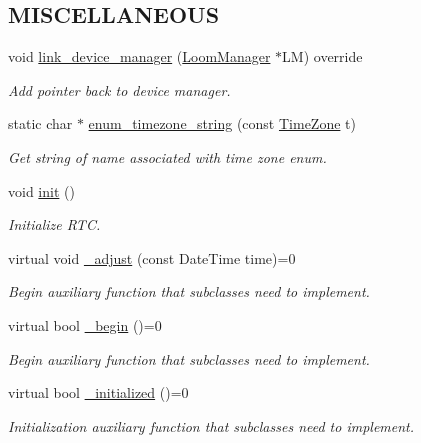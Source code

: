 \subsection*{M\+I\+S\+C\+E\+L\+L\+A\+N\+E\+O\+US}
\begin{DoxyCompactItemize}
\item 
void \hyperlink{class_loom_r_t_c_a24c72617d7e275e89740af4f5296e42b}{link\+\_\+device\+\_\+manager} (\hyperlink{class_loom_manager}{Loom\+Manager} $\ast$LM) override
\begin{DoxyCompactList}\small\item\em Add pointer back to device manager. \end{DoxyCompactList}\item 
static char $\ast$ \hyperlink{class_loom_r_t_c_ae388e3498ce6b942ccff838c2a4359fb}{enum\+\_\+timezone\+\_\+string} (const \hyperlink{class_loom_r_t_c_a103a9db94b031555185bbce688d2527a}{Time\+Zone} t)
\begin{DoxyCompactList}\small\item\em Get string of name associated with time zone enum. \end{DoxyCompactList}\item 
void \hyperlink{class_loom_r_t_c_a008e89e23f3650d1e8a9c96fe1d8c857}{init} ()
\begin{DoxyCompactList}\small\item\em Initialize R\+TC. \end{DoxyCompactList}\item 
virtual void \hyperlink{class_loom_r_t_c_a748cbec6163eee36ec96346526b8094d}{\+\_\+adjust} (const Date\+Time time)=0
\begin{DoxyCompactList}\small\item\em Begin auxiliary function that subclasses need to implement. \end{DoxyCompactList}\item 
virtual bool \hyperlink{class_loom_r_t_c_a92103dd50b8ed11cd84fc8f08557ab09}{\+\_\+begin} ()=0
\begin{DoxyCompactList}\small\item\em Begin auxiliary function that subclasses need to implement. \end{DoxyCompactList}\item 
virtual bool \hyperlink{class_loom_r_t_c_a601c266811b25f0d16cbe2ae18ec5b41}{\+\_\+initialized} ()=0
\begin{DoxyCompactList}\small\item\em Initialization auxiliary function that subclasses need to implement. \end{DoxyCompactList}\item 

\end{DoxyCompactItemize}
